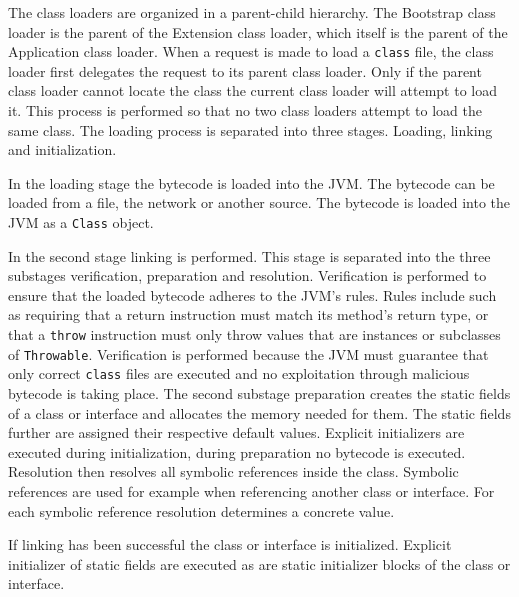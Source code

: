 The class loaders are organized in a parent-child hierarchy. The Bootstrap class loader is the parent of the Extension class loader, which itself is the parent of the Application class loader. When a request is made to load a \texttt{class} file, the class loader first delegates the request to its parent class loader. Only if the parent class loader cannot locate the class the current class loader will attempt to load it. This process is performed so that no two class loaders attempt to load the same class. The loading process is separated into three stages. Loading, linking and initialization.

In the loading stage the bytecode is loaded into the JVM. The bytecode can be loaded from a file, the network or another source. The bytecode is loaded into the JVM as a \texttt{Class} object.

In the second stage linking is performed. This stage is separated into the three substages verification, preparation and resolution. Verification is performed to ensure that the loaded bytecode adheres to the JVM's rules. Rules include such as requiring that a return instruction must match its method's return type, or that a \texttt{throw} instruction must only throw values that are instances or subclasses of \texttt{Throwable}. Verification is performed because the JVM must guarantee that only correct \texttt{class} files are executed and no exploitation through malicious bytecode is taking place. The second substage preparation creates the static fields of a class or interface and allocates the memory needed for them. The static fields further are assigned their respective default values. Explicit initializers are executed during initialization, during preparation no bytecode is executed. Resolution then resolves all symbolic references inside the class. Symbolic references are used for example when referencing another class or interface. For each symbolic reference resolution determines a concrete value. 

If linking has been successful the class or interface is initialized. Explicit initializer of static fields are executed as are static initializer blocks of the class or interface.













